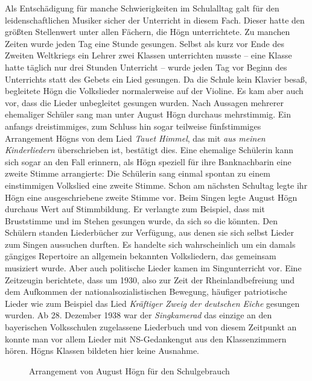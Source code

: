 Als Entschädigung für manche Schwierigkeiten im Schulalltag galt für den
leidenschaftlichen Musiker sicher der Unterricht in diesem Fach. Dieser
hatte den größten Stellenwert unter allen Fächern, die Högn
unterrichtete. Zu manchen Zeiten wurde jeden Tag eine Stunde
gesungen. Selbst als kurz vor Ende des Zweiten Weltkriegs ein Lehrer
zwei Klassen unterrichten musste – eine Klasse hatte täglich nur drei
Stunden Unterricht – wurde jeden Tag vor Beginn des Unterrichts statt
des Gebets ein Lied gesungen. Da die Schule kein Klavier besaß,
begleitete Högn die Volkslieder normalerweise auf der Violine. Es kam
aber auch vor, dass die Lieder unbegleitet gesungen wurden. Nach
Aussagen mehrerer ehemaliger Schüler sang man unter August Högn
durchaus mehrstimmig. Ein anfangs dreistimmiges, zum Schluss hin
sogar teilweise fünfstimmiges Arrangement Högns von dem Lied
\textit{Tauet Himmel}, das mit \textit{aus meinen Kinderliedern}
überschrieben ist, bestätigt dies. Eine ehemalige Schülerin kann sich
sogar an den Fall erinnern, als Högn speziell für ihre Banknachbarin
eine zweite Stimme arrangierte: Die Schülerin sang einmal spontan zu
einem einstimmigen Volkslied eine zweite Stimme. Schon am nächsten
Schultag legte ihr Högn eine ausgeschriebene zweite Stimme vor. Beim
Singen legte August Högn durchaus Wert auf Stimmbildung. Er verlangte
zum Beispiel, dass mit Bruststimme und im Stehen gesungen wurde, da
sich so die  könnten. Den
Schülern standen Liederbücher zur Verfügung, aus denen sie sich selbst
Lieder zum Singen aussuchen durften. Es handelte sich wahrscheinlich
um ein damals gängiges Repertoire an allgemein bekannten
Volksliedern, das gemeinsam musiziert wurde. Aber auch politische
Lieder kamen im Singunterricht vor. Eine Zeitzeugin berichtete, dass um
1930, also zur Zeit der Rheinlandbefreiung und dem Aufkommen der
nationalsozialistischen Bewegung, häufiger patriotische Lieder wie zum
Beispiel das Lied \textit{Kräftiger Zweig} \textit{der deutschen Eiche}
gesungen wurden. Ab 28. Dezember 1938 war der \textit{Singkamerad}
das einzige an den bayerischen Volksschulen zugelassene Liederbuch und
von diesem Zeitpunkt an konnte man vor allem Lieder mit
NS-Gedankengut aus den Klassenzimmern hören. Högns Klassen bildeten
hier keine Ausnahme.

\begin{figure}
\caption{Arrangement von August Högn für den Schulgebrauch}
\end{figure}